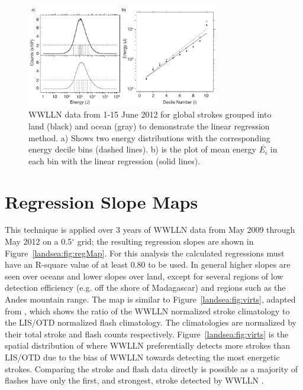 \begin{figure}[ht!]
   \centering
   \noindent\includegraphics[width=20pc]{LandSea/Figures/1_linearRegression.pdf} 
   \caption{WWLLN data from 1-15 June 2012 for global strokes grouped into land (black) and ocean (gray) to demonstrate the linear regression method. a) Shows two energy distributions with the corresponding energy decile bins (dashed lines). b) is the plot of mean energy $\overline{E_i}$ in each bin with the linear regression (solid lines).}
   \label{landsea:fig:linRegTheory}
\end{figure}

\section{Regression Slope Maps}

This technique is applied over 3 years of WWLLN data from May 2009 through May 2012 on a 0.5$^\circ$ grid; the resulting regression slopes are shown in Figure~\ref{landsea:fig:regMap}.
For this analysis the calculated regressions must have an R-square value of at least 0.80 to be used.
In general higher slopes are seen over oceans and lower slopes over land, except for several regions of low detection efficiency (e.g. off the shore of Madagascar) and regions such as the Andes mountain range.
The map is similar to Figure~\ref{landsea:fig:virts}, adapted from \citet{Virts2013}, which shows the ratio of the WWLLN normalized stroke climatology to the LIS/OTD normalized flash climatology.
The climatologies are normalized by their total stroke and flash counts respectively.
Figure~\ref{landsea:fig:virts} is the spatial distribution of where WWLLN preferentially detects more strokes than LIS/OTD due to the bias of WWLLN towards detecting the most energetic strokes.
Comparing the stroke and flash data directly is possible as a majority of flashes have only the first, and strongest, stroke detected by WWLLN \citep{Abarca2010}.

